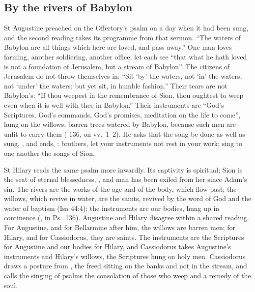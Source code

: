 \subsection{By the rivers of Babylon}

St Augustine preached on the Offertory's psalm on a day when it had been sung,
and the second reading takes its programme from that sermon. ``The waters of
Babylon are all things which here are loved, and pass away.'' One man loves
farming, another soldiering, another office; let each see ``that what he hath
loved is not a foundation of Jerusalem, but a stream of Babylon''. The citizens
of Jerusalem do not throw themselves in: ``Sit `by' the waters, not `in' the
waters, not `under' the waters; but yet sit, in humble fashion.'' Their tears
are not Babylon's: ``If thou weepest in the remembrance of Sion, thou oughtest
to weep even when it is well with thee in Babylon.'' Their instruments are
``God's Scriptures, God's commands, God's promises, meditation on the life to
come'', hung on the willows, barren trees watered by Babylon, because such men
are unfit to carry them ( 136, on vv.~1--2). He asks that the
song be done as well as sung, , and ends, : brothers, let your instruments not rest in your
work; sing to one another the songs of Sion.

St Hilary reads the same psalm more inwardly. Its captivity is spiritual; Sion
is the seat of eternal blessedness, ,
and man has been exiled from her since Adam's sin. The rivers are the works of
the age and of the body, which flow past; the willows, which revive in water,
are the saints, revived by the word of God and the water of baptism (Isa 44:4);
the instruments are our bodies, hung up in continence (, in Ps.~136). Augustine and Hilary disagree within a shared reading.
For Augustine, and for Bellarmine after him, the willows are barren men; for
Hilary, and for Cassiodorus, they are saints. The instruments are the
Scriptures for Augustine and our bodies for Hilary, and Cassiodorus takes
Augustine's instruments and Hilary's willows, the Scriptures hung on holy men.
Cassiodorus draws a posture from , the freed sitting on the
banks and not in the stream, and calls the singing of psalms the consolation of
those who weep and a remedy of the soul.

